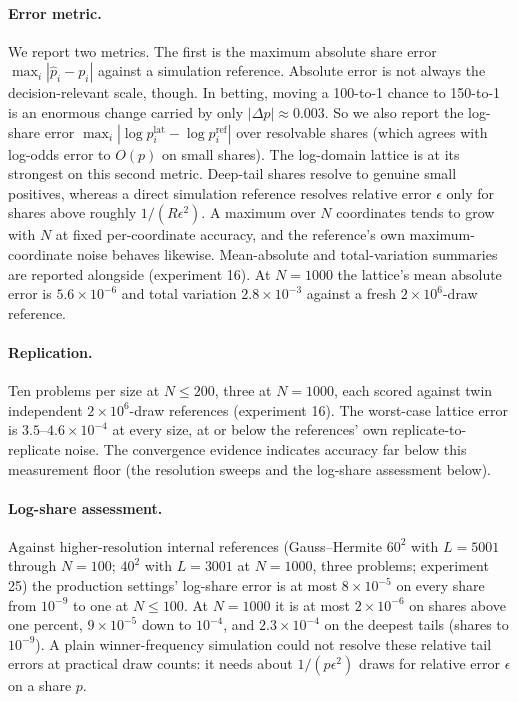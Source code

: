 \documentclass[12pt]{article}
\theoremstyle{remark}
\begin{document}
\paragraph{Error metric.} We report two metrics. The first is the
maximum absolute share error $\max_i |\hat p_i - p_i|$ against a
simulation reference. Absolute error is not always the decision-relevant
scale, though. In betting, moving a 100-to-1 chance to 150-to-1 is an
enormous change carried by only $|\Delta p| \approx 0.003$. So we also
report the log-share error $\max_i |\log p^{\mathrm{lat}}_i -
\log p_i^{\mathrm{ref}}|$ over resolvable shares (which agrees with
log-odds error to $O(p)$ on small shares). The log-domain lattice is at
its strongest on this second metric. Deep-tail shares resolve to genuine
small positives, whereas a direct simulation reference resolves relative
error $\epsilon$ only for shares above roughly $1/(R\epsilon^2)$. A maximum over $N$ coordinates tends to grow with $N$ at fixed
per-coordinate accuracy, and the reference's own maximum-coordinate noise
behaves likewise. Mean-absolute and total-variation summaries are
reported alongside (experiment 16). At $N=1000$ the lattice's mean
absolute error is
$5.6\times10^{-6}$ and total variation $2.8\times10^{-3}$ against a fresh
$2\times10^6$-draw reference.

\paragraph{Replication.} Ten problems per size at $N \le 200$, three at
$N=1000$, each scored against twin independent $2\times10^6$-draw
references (experiment 16). The worst-case lattice error is
$3.5$--$4.6\times10^{-4}$ at every size, at or below the references' own
replicate-to-replicate noise. The convergence evidence indicates accuracy far
below this measurement floor (the resolution sweeps and the log-share
assessment below).

\paragraph{Log-share assessment.} Against higher-resolution internal references
(Gauss--Hermite $60^2$ with $L=5001$ through $N=100$; $40^2$ with
$L=3001$ at $N=1000$, three problems; experiment 25) the production
settings' log-share error is at most $8\times10^{-5}$ on every share from
$10^{-9}$ to one at $N \le 100$. At $N=1000$ it is at most
$2\times10^{-6}$ on shares above one percent, $9\times10^{-5}$ down to
$10^{-4}$, and $2.3\times10^{-4}$ on the deepest tails (shares to
$10^{-9}$). A plain winner-frequency simulation could not resolve these
relative tail errors at practical draw counts: it needs about
$1/(p\epsilon^2)$ draws for relative error $\epsilon$ on a share $p$.
\end{document}
